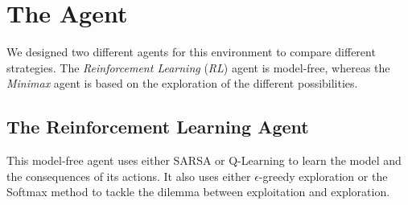\documentclass[journal, a4paper]{IEEEtran}
\begin{document}
\section{The Agent}

We designed two different agents for this environment to compare different strategies.
The \emph{Reinforcement Learning} (\emph{RL}) agent is model-free, whereas the \emph{Minimax} agent is based on the exploration of the different possibilities.

\subsection{The Reinforcement Learning Agent\label{rl_agent}}

This model-free agent uses either SARSA or Q-Learning to learn the model and the consequences of its actions.
It also uses either $\epsilon$-greedy exploration or the Softmax method to tackle the dilemma between exploitation and exploration.
\end{document}
